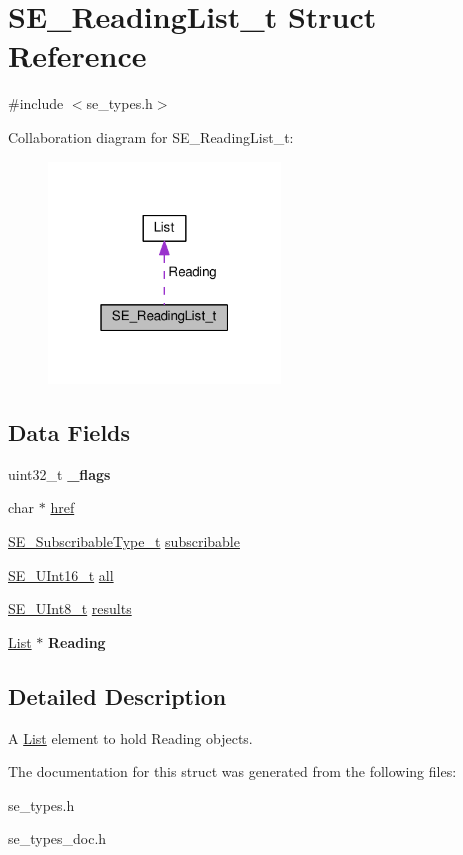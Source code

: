 \hypertarget{structSE__ReadingList__t}{}\section{S\+E\+\_\+\+Reading\+List\+\_\+t Struct Reference}
\label{structSE__ReadingList__t}


{\ttfamily \#include $<$se\+\_\+types.\+h$>$}



Collaboration diagram for S\+E\+\_\+\+Reading\+List\+\_\+t\+:\nopagebreak
\begin{figure}[H]
\begin{center}
\leavevmode
\includegraphics[width=175pt]{structSE__ReadingList__t__coll__graph}
\end{center}
\end{figure}
\subsection*{Data Fields}
\begin{DoxyCompactItemize}
\item 
uint32\+\_\+t {\bfseries \+\_\+flags}
\item 
char $\ast$ \hyperlink{group__ReadingList_gafacf2687a03d5902e11e06224e91c913}{href}
\item 
\hyperlink{group__SubscribableType_ga5c41f553d369710ed34619266bf2551e}{S\+E\+\_\+\+Subscribable\+Type\+\_\+t} \hyperlink{group__ReadingList_ga54934e5a4ccf3fcbd4c0ce1cdf10ae39}{subscribable}
\item 
\hyperlink{group__UInt16_gac68d541f189538bfd30cfaa712d20d29}{S\+E\+\_\+\+U\+Int16\+\_\+t} \hyperlink{group__ReadingList_ga286e4a2b165954ebcbb3d051b2a2943d}{all}
\item 
\hyperlink{group__UInt8_gaf7c365a1acfe204e3a67c16ed44572f5}{S\+E\+\_\+\+U\+Int8\+\_\+t} \hyperlink{group__ReadingList_ga8729b48b25f26873984e4198c0fc2cbf}{results}
\item 
\hyperlink{structList}{List} $\ast$ {\bfseries Reading}
\end{DoxyCompactItemize}


\subsection{Detailed Description}
A \hyperlink{structList}{List} element to hold Reading objects. 

The documentation for this struct was generated from the following files\+:\begin{DoxyCompactItemize}
\item 
se\+\_\+types.\+h\item 
se\+\_\+types\+\_\+doc.\+h\end{DoxyCompactItemize}
